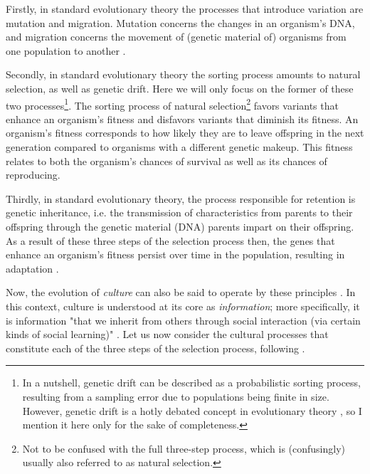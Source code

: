 Firstly, in standard evolutionary theory the processes that introduce variation are mutation and migration. Mutation concerns the changes in an organism's DNA, and migration concerns the movement of (genetic material of) organisms from one population to another \citep{S-P13}.

Secondly, in standard evolutionary theory the sorting process amounts to natural selection, as well as genetic drift. Here we will only focus on the former of these two processes\footnote{In a nutshell, genetic drift can be described as a probabilistic sorting process, resulting from a sampling error due to populations being finite in size. However, genetic drift is a hotly debated concept in evolutionary theory \citep[see][for an overview]{Millstein21}, so I mention it here only for the sake of completeness.}.
The sorting process of natural selection\footnote{Not to be confused with the full three-step process, which is (confusingly) usually also referred to as natural selection.}
favors variants that enhance an organism's fitness and disfavors variants that diminish its fitness.
An organism's fitness corresponds to how likely they are to leave offspring in the next generation compared to organisms with a different genetic makeup. This fitness relates to both the organism's chances of survival as well as its chances of reproducing.

Thirdly, in standard evolutionary theory, the process responsible for retention is genetic inheritance, i.e. the transmission of characteristics from parents to their offspring through the genetic material (DNA) parents impart on their offspring.
As a result of these three steps of the selection process then, the genes that enhance an organism's fitness persist over time in the population, resulting in adaptation \citep{S-P13}.

Now, the evolution of \emph{culture} can also be said to operate by these principles \citep{Heyes18}. In this context, culture is understood at its core as \emph{information}; more specifically, it is information "that we inherit from others through social interaction (via certain kinds of social learning)" \citep[p.~30]{Heyes18}.
Let us now consider the cultural processes that constitute each of the three steps of the selection process, following \citet[pp.~33--34]{Heyes18}.

